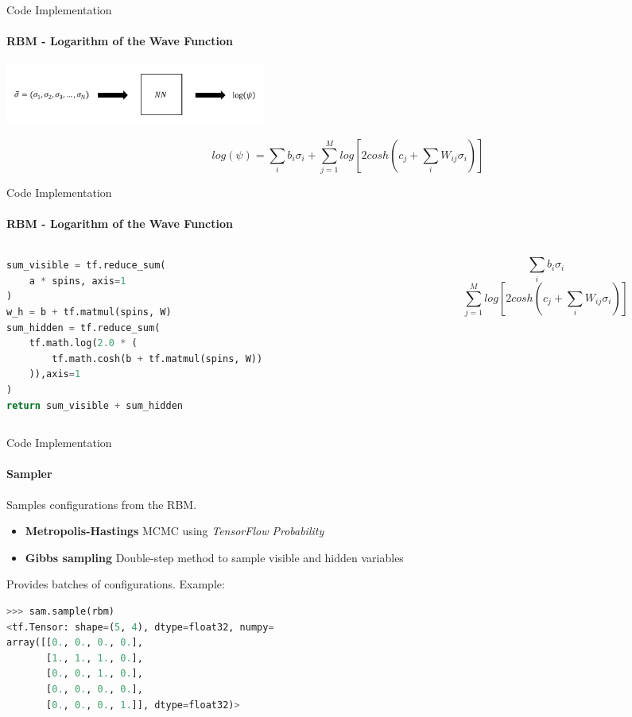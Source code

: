 \documentclass{beamer}
\begin{document}
\begin{frame}[fragile]{Code Implementation}
\framesubtitle{RBM - Logarithm of the Wave Function}

\begin{center}
    \includegraphics[height=2cm]{images/rbm_usage.png}
\end{center}

$$log\left(\psi\right) = \sum_{i} b_i \sigma_i + \sum_{j=1}^{M} log\left[{2 cosh\left(c_j + \sum_{i} W_{ij} \sigma_i\right)} \right]$$

\end{frame}

\begin{frame}[fragile]{Code Implementation}
\framesubtitle{RBM - Logarithm of the Wave Function}
\begin{columns}
\begin{column}{0.6\textwidth}
\begin{lstlisting}[language=Python, style=kaolstplain]
sum_visible = tf.reduce_sum(
	a * spins, axis=1
)
w_h = b + tf.matmul(spins, W)
sum_hidden = tf.reduce_sum(
	tf.math.log(2.0 * (
		tf.math.cosh(b + tf.matmul(spins, W))
	)),axis=1
)
return sum_visible + sum_hidden
\end{lstlisting}
\end{column}
\begin{column}{0.38\textwidth}
$$\sum_{i} b_i \sigma_i$$
$$\sum_{j=1}^{M} log\left[{2 cosh\left(c_j + \sum_{i} W_{ij} \sigma_i\right)} \right]$$
\end{column}
\end{columns}

\end{frame}


\begin{frame}[fragile]{Code Implementation}
\framesubtitle{Sampler}

Samples configurations from the RBM.

\begin{itemize}
    \item \textbf{Metropolis-Hastings} MCMC using \textit{TensorFlow Probability}
    \item \textbf{Gibbs sampling} Double-step method to sample visible and hidden variables
\end{itemize}

Provides batches of configurations. Example:
\begin{center}
\begin{lstlisting}[language=Python, style=kaolstplain]
>>> sam.sample(rbm)
<tf.Tensor: shape=(5, 4), dtype=float32, numpy=
array([[0., 0., 0., 0.],
       [1., 1., 1., 0.],
       [0., 0., 1., 0.],
       [0., 0., 0., 0.],
       [0., 0., 0., 1.]], dtype=float32)>
\end{lstlisting}	
\end{center}

\end{frame}
\end{document}
